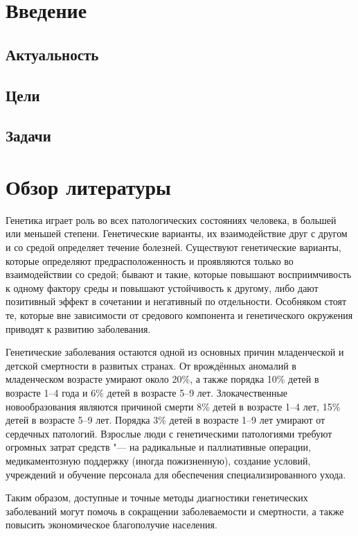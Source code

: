 \documentclass[a4paper,12pt]{article}
\begin{document}
\section{Введение}

\subsection{Актуальность}

\subsection{Цели}

\subsection{Задачи}

\section{Обзор литературы}

Генетика играет роль во всех патологических состояниях человека, в большей или меньшей степени.
Генетические варианты, их взаимодействие друг с другом и со средой определяет течение болезней.
Существуют генетические варианты, которые определяют предрасположенность и проявляются только во взаимодействии со средой; бывают и такие, которые повышают восприимчивость к одному фактору среды и повышают устойчивость к другому, либо дают позитивный эффект в сочетании и негативный по отдельности.
Особняком стоят те, которые вне зависимости от средового компонента и генетического окружения приводят к развитию заболевания.

Генетические заболевания остаются одной из основных причин младенческой и детской смертности в развитых странах.
От врождённых аномалий в младенческом возрасте умирают около 20\%, а также порядка 10\% детей в возрасте 1--4 года и 6\% детей в возрасте 5--9 лет.
Злокачественные новообразования являются причиной смерти 8\% детей в возрасте 1--4 лет, 15\% детей в возрасте 5--9 лет.
Порядка 3\% детей в возрасте 1--9 лет умирают от сердечных патологий\cite{field}.
Взрослые люди с генетическими патологиями требуют огромных затрат средств "--- на радикальные и паллиативные операции, медикаментозную поддержку (иногда пожизненную), создание условий, учреждений и обучение персонала для обеспечения специализированного ухода.

Таким образом, доступные и точные методы диагностики генетических заболеваний могут помочь в сокращении заболеваемости и смертности, а также повысить экономическое благополучие населения.
\end{document}
